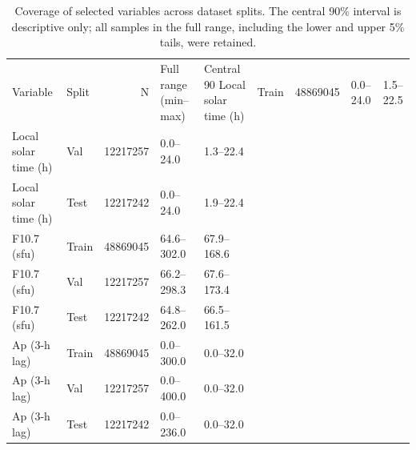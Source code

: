\begin{table}
\caption{Coverage of selected variables across dataset splits. The central 90\% interval is descriptive only; all samples in the full range, including the lower and upper 5\% tails, were retained.}
\label{tab:dataset_coverage}
\begin{tabular}{llrll}
\toprule
Variable & Split & N & Full range (min–max) & Central 90%
\midrule
Local solar time (h) & Train & 48869045 & 0.0–24.0 & 1.5–22.5 \\
Local solar time (h) & Val & 12217257 & 0.0–24.0 & 1.3–22.4 \\
Local solar time (h) & Test & 12217242 & 0.0–24.0 & 1.9–22.4 \\
F10.7 (sfu) & Train & 48869045 & 64.6–302.0 & 67.9–168.6 \\
F10.7 (sfu) & Val & 12217257 & 66.2–298.3 & 67.6–173.4 \\
F10.7 (sfu) & Test & 12217242 & 64.8–262.0 & 66.5–161.5 \\
Ap (3-h lag) & Train & 48869045 & 0.0–300.0 & 0.0–32.0 \\
Ap (3-h lag) & Val & 12217257 & 0.0–400.0 & 0.0–32.0 \\
Ap (3-h lag) & Test & 12217242 & 0.0–236.0 & 0.0–32.0 \\
\bottomrule
\end{tabular}
\end{table}
